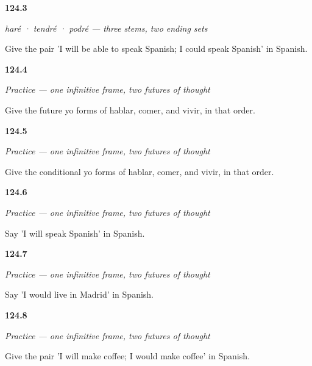 \noindent\begin{minipage}[t]{\linewidth}
\raggedright
\hypertarget{review-ES-C17-irregulares-poder-pair}{\textbf{124.3}} \emph{haré · tendré · podré — three stems, two ending sets}\par
\small Give the pair 'I will be able to speak Spanish; I could speak Spanish' in Spanish.
\end{minipage}\par\medskip

\noindent\begin{minipage}[t]{\linewidth}
\raggedright
\hypertarget{review-ES-C17-practice-regular-future-yo}{\textbf{124.4}} \emph{Practice — one infinitive frame, two futures of thought}\par
\small Give the future yo forms of hablar, comer, and vivir, in that order.
\end{minipage}\par\medskip

\noindent\begin{minipage}[t]{\linewidth}
\raggedright
\hypertarget{review-ES-C17-practice-regular-conditional-yo}{\textbf{124.5}} \emph{Practice — one infinitive frame, two futures of thought}\par
\small Give the conditional yo forms of hablar, comer, and vivir, in that order.
\end{minipage}\par\medskip

\noindent\begin{minipage}[t]{\linewidth}
\raggedright
\hypertarget{review-ES-C17-practice-hablare-espanol}{\textbf{124.6}} \emph{Practice — one infinitive frame, two futures of thought}\par
\small Say 'I will speak Spanish' in Spanish.
\end{minipage}\par\medskip

\noindent\begin{minipage}[t]{\linewidth}
\raggedright
\hypertarget{review-ES-C17-practice-viviria-madrid}{\textbf{124.7}} \emph{Practice — one infinitive frame, two futures of thought}\par
\small Say 'I would live in Madrid' in Spanish.
\end{minipage}\par\medskip

\noindent\begin{minipage}[t]{\linewidth}
\raggedright
\hypertarget{review-ES-C17-practice-hacer-pair}{\textbf{124.8}} \emph{Practice — one infinitive frame, two futures of thought}\par
\small Give the pair 'I will make coffee; I would make coffee' in Spanish.
\end{minipage}\par\medskip

